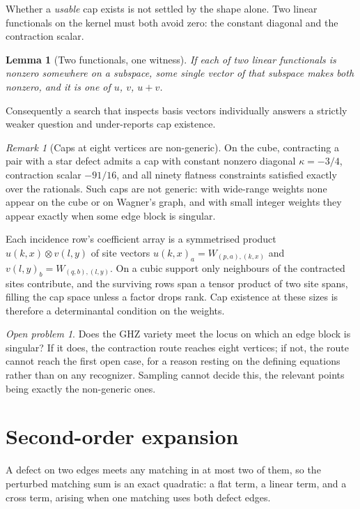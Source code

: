 \documentclass[11pt]{article}
\newtheorem{lemma}[theorem]{Lemma}
\theoremstyle{definition}
\theoremstyle{remark}
\newtheorem{remark}[theorem]{Remark}
\newtheorem{openq}[theorem]{Open problem}
\begin{document}
Whether a \emph{usable} cap exists is not settled by the shape alone. Two linear
functionals on the kernel must both avoid zero: the constant diagonal and the
contraction scalar.

\begin{lemma}[Two functionals, one witness]
If each of two linear functionals is nonzero somewhere on a subspace, some single
vector of that subspace makes both nonzero, and it is one of $u$, $v$, $u+v$.
\end{lemma}

Consequently a search that inspects basis vectors individually answers a strictly
weaker question and under-reports cap existence.

\begin{remark}[Caps at eight vertices are non-generic]
On the cube, contracting a pair with a star defect admits a cap with constant nonzero
diagonal $\kappa=-3/4$, contraction scalar $-91/16$, and all ninety flatness
constraints satisfied exactly over the rationals. Such caps are not generic: with
wide-range weights none appear on the cube or on Wagner's graph, and with small integer
weights they appear exactly when some edge block is singular.

Each incidence row's coefficient array is a symmetrised product $u(k,x)\otimes v(l,y)$
of site vectors $u(k,x)_a=W_{(p,a),(k,x)}$ and $v(l,y)_b=W_{(q,b),(l,y)}$. On a cubic
support only neighbours of the contracted sites contribute, and the surviving rows span
a tensor product of two site spans, filling the cap space unless a factor drops rank.
Cap existence at these sizes is therefore a determinantal condition on the weights.
\end{remark}

\begin{openq}
Does the GHZ variety meet the locus on which an edge block is singular? If it does, the
contraction route reaches eight vertices; if not, the route cannot reach the first open
case, for a reason resting on the defining equations rather than on any recognizer.
Sampling cannot decide this, the relevant points being exactly the non-generic ones.
\end{openq}

\section{Second-order expansion}\label{sec:second}

A defect on two edges meets any matching in at most two of them, so the perturbed
matching sum is an exact quadratic: a flat term, a linear term, and a cross term,
arising when one matching uses both defect edges.
\end{document}
